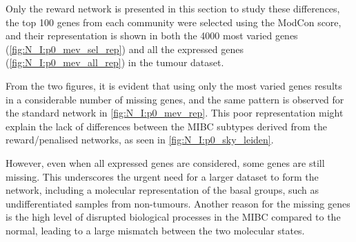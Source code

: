Only the reward network is presented in this section to study these differences, the top 100 genes from each community were selected using the ModCon score, and their representation is shown in both the 4000 most varied genes (\cref{fig:N_I:p0_mev_sel_rep}) and all the expressed genes (\cref{fig:N_I:p0_mev_all_rep}) in the tumour dataset.

From the two figures, it is evident that using only the most varied genes results in a considerable number of missing genes, and the same pattern is observed for the standard network in \cref{fig:N_I:p0_mev_rep}. This poor representation might explain the lack of differences between the MIBC subtypes derived from the reward/penalised networks, as seen in \cref{fig:N_I:p0_sky_leiden}.

However, even when all expressed genes are considered, some genes are still missing. This underscores the urgent need for a larger dataset to form the network, including a molecular representation of the basal groups, such as undifferentiated samples from non-tumours. Another reason for the missing genes is the high level of disrupted biological processes in the MIBC compared to the normal, leading to a large mismatch between the two molecular states.


